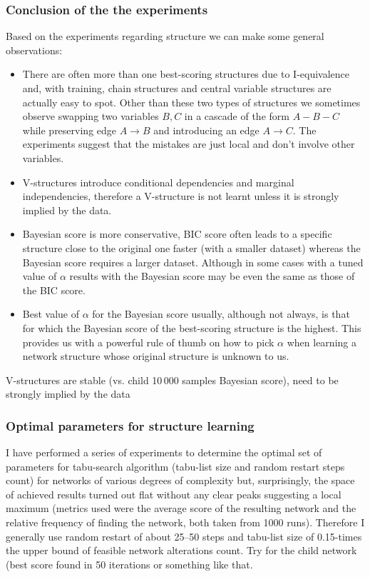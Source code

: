 \documentclass[english,cover]{fitthesis} %
\newcommand{\todo}[1]{{\color{red}#1}}
\begin{document}
\subsubsection{Conclusion of the the experiments}
Based on the experiments regarding structure we can make some general observations:
\begin{itemize}
    \item There are often more than one best-scoring structures due to I-equivalence and, with training, chain structures and central variable structures are actually easy to spot. Other than these two types of structures we sometimes observe swapping two variables $B,C$ in a cascade of the form $A-B-C$ while preserving edge $A \rightarrow B$ and introducing an edge $A \rightarrow C$. The experiments suggest that the mistakes are just local and don't involve other variables.
    \item V-structures introduce conditional dependencies and marginal independencies, therefore a V-structure is not learnt unless it is strongly implied by the data.
    \item Bayesian score is more conservative, BIC score often leads to a specific structure close to the original one faster (with a smaller dataset) whereas the Bayesian score requires a larger dataset. Although in some cases with a tuned value of $\alpha$ results with the Bayesian score may be even the same as those of the BIC score.
    \item Best value of $\alpha$ for the Bayesian score usually, although not always, is that for which the Bayesian score of the best-scoring structure is the highest. This provides us with a powerful rule of thumb on how to pick $\alpha$ when learning a network structure whose original structure is unknown to us.
\end{itemize}

\todo{
V-structures are stable (vs. child 10\,000 samples Bayesian score), need to be strongly implied by the data
}


\subsubsection{Optimal parameters for structure learning}
I have performed a series of experiments to determine the optimal set of parameters for tabu-search algorithm (tabu-list size and random restart steps count) for networks of various degrees of complexity but, surprisingly, the space of achieved results turned out flat without any clear peaks suggesting a local maximum (metrics used were the average score of the resulting network and the relative frequency of finding the  network, both taken from 1000 runs). Therefore I generally use random restart of about 25--50 steps and tabu-list size of 0.15-times the upper bound of feasible network alterations count. \todo{Try for the child network (best score found in 50 iterations or something like that.}
\end{document}

